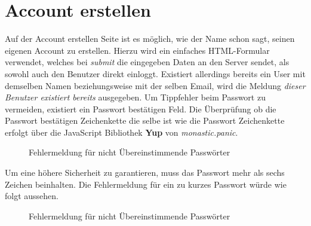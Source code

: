 \section{Account erstellen}

Auf der Account erstellen Seite ist es möglich, wie der Name schon sagt, seinen eigenen Account zu erstellen. Hierzu wird ein 
einfaches HTML-Formular verwendet, welches bei \textit{submit} die eingegeben Daten an den Server sendet,
als sowohl auch den Benutzer direkt einloggt. Existiert allerdings bereits ein User mit demselben Namen 
beziehungsweise mit der selben Email, wird die Meldung \textit{dieser Benutzer existiert bereits} ausgegeben. Um 
Tippfehler beim Passwort zu vermeiden, existiert ein Passwort bestätigen Feld. Die Überprüfung ob die
Passwort bestätigen Zeichenkette die selbe ist wie die Passwort Zeichenkette erfolgt über die 
JavaScript Bibliothek \textbf{Yup} von \textit{monastic.panic}.

\begin{figure}[H]
    \begin{center}
      \caption{Fehlermeldung für nicht Übereinstimmende Passwörter}
    \end{center}
\end{figure}
\pagebreak

Um eine höhere Sicherheit zu garantieren, muss das Passwort mehr als sechs Zeichen beinhalten. Die 
Fehlermeldung für ein zu kurzes Passwort würde wie folgt aussehen.

\begin{figure}[H]
    \begin{center}
      \caption{Fehlermeldung für nicht Übereinstimmende Passwörter}
    \end{center}
\end{figure}


\label{createAccount}
